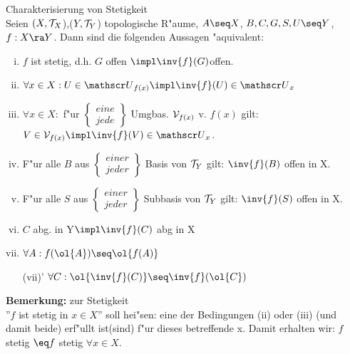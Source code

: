 \begin{satz}\label{4.2}{\sc Charakterisierung von Stetigkeit}\\
Seien $(X,\mathcal T_X$),($Y,\mathcal T_Y$) topologische R"aume, $A\seq X$, $B, C, G, S, U \seq Y$, $f:X\ra Y$. Dann sind die folgenden Aussagen "aquivalent:
\begin{enumerate}[(i)]
\item $f$ ist stetig, d.h. $G$ offen $\impl \inv{f}(G)$offen.
\item $\forall x\in X: U\in\umg{U}{f(x)}\impl\inv{f}(U)\in\umg{U}{x}$
\item $\forall x\in X:$ f"ur $\left\{\begin{array}{c}eine\\jede\end{array}\right\}$ Umgbas. ${\mathcal V}_{f(x)}$ v. $f(x)$ gilt: $V\in\umgbas{V}{f(x)}\impl\inv{f}(V)\in\umg{U}{x}$.
\item F"ur alle $B$ aus $\left\{\begin{array}{c}einer\\jeder\end{array}\right\}$ Basis von $\mathcal T_Y$ gilt: $\inv{f}(B)$ offen in X.
\item F"ur alle $S$ aus $\left\{\begin{array}{c}einer\\jeder\end{array}\right\}$ Subbasis von $\mathcal T_Y$ gilt: $\inv{f}(S)$ offen in X.
\item $C$ abg. in Y$\impl \inv{f}(C)$ abg in X
\item $\forall A:f(\ol{A})\seq \ol{f(A)}$
\item[(vii)'] $\forall C: \ol{\inv{f}(C)}\seq\inv{f}(\ol{C})$
\end{enumerate}
{\bf Bemerkung:} zur Stetigkeit\\
''$f$ ist stetig in $x\in X$'' soll hei"sen: eine der Bedingungen (ii) oder (iii) (und damit beide) erf"ullt ist(sind) f"ur dieses betreffende x. Damit erhalten wir: $f$ stetig $\eq f$ stetig $\forall x\in X$.
\end{satz}
